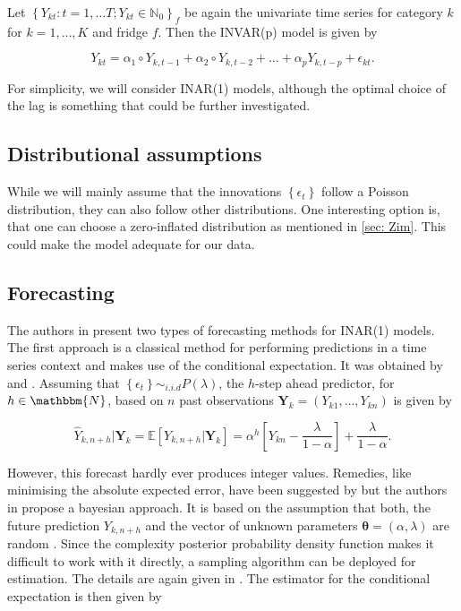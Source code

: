 Let $\left\{Y_{kt}:t=1,\ldots T; Y_{kt} \in \mathbb{N}_0\right\}_f$ be again the univariate time series for category $k$ for $k=1,\ldots,K$ and fridge $f$. Then the INVAR(p) model is given by

\begin{equation}
Y_{kt} = \alpha_1 \circ Y_{k,t-1} + \alpha_2 \circ Y_{k,t-2} + \ldots + \alpha_p Y_{k,t-p} +\epsilon_{kt}.
\label{eq:Inar(p) model ts}
\end{equation}

For simplicity, we will consider INAR(1) models, although the optimal choice of the lag is something that could be further investigated. 

\subsection{Distributional assumptions}
\label{sec: Inar Distributional assumptions}

While we will mainly assume that the innovations $\left\{\epsilon_t\right\}$ follow a Poisson distribution, they can also follow other distributions. One interesting option is, that one can choose a zero-inflated distribution as mentioned in \ref{sec: Zim}. This could make the model adequate for our data. 


\subsection{Forecasting}
\label{sec: Inar Forecasting}

The authors in \cite{Silva:2005} present two types of forecasting methods for INAR(1) models. The first approach is a classical method for performing predictions in a time series context and makes use of the conditional expectation. It was obtained by \cite{Bre:1993} and \cite{Freeland:2004}. Assuming that $\left\{\epsilon_t\right\} \sim_{i.i.d} P(\lambda)$, the $h$-step ahead predictor, for $h\in \mathbbm{N}$, based on $n$ past observations $\bm{Y}_k=(Y_{k1},\ldots,Y_{kn})$ is given by

\begin{equation}
\hat{Y}_{k,n+h} | \bm{Y}_k = \mathbb{E}[Y_{k,n+h} | \bm{Y}_k] = \alpha^h \left[Y_{kn}- \frac{\lambda}{1-\alpha} \right] + \frac{\lambda}{1-\alpha}.
\label{eq:Forecasting Classic}
\end{equation}


However, this forecast hardly ever produces integer values. Remedies, like minimising the absolute expected error, have been suggested by \cite{Freeland:2004} but the authors in \cite{Silva:2005} propose a bayesian approach. It is based on the assumption that both, the future prediction $Y_{k,n+h}$ and the vector of unknown parameters $\bm{\theta}=(\alpha,\lambda)$ are random \cite{Silva:2005}. Since the complexity posterior probability density function makes it difficult to work with it directly, a sampling algorithm can be deployed for estimation. The details are again given in \cite{Silva:2005}. The estimator for the conditional expectation is then given by

